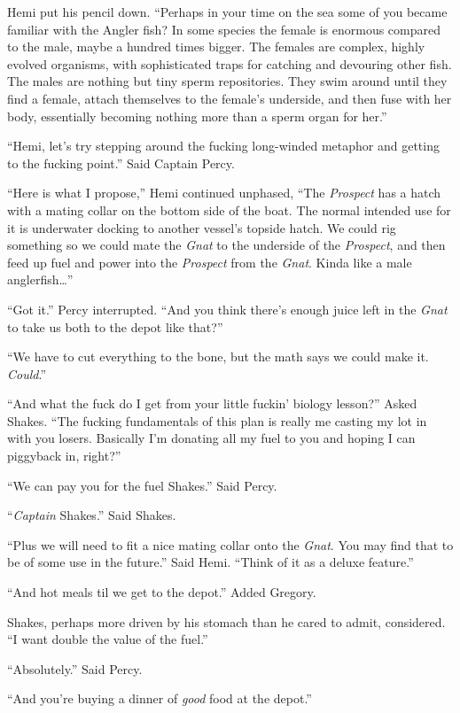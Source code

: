 \documentclass[]{scrbook}
\begin{document}
Hemi put his pencil down. ``Perhaps in your time on the sea some of you
became familiar with the Angler fish? In some species the female is
enormous compared to the male, maybe a hundred times bigger. The females
are complex, highly evolved organisms, with sophisticated traps for
catching and devouring other fish. The males are nothing but tiny sperm
repositories. They swim around until they find a female, attach
themselves to the female's underside, and then fuse with her body,
essentially becoming nothing more than a sperm organ for her.''

``Hemi, let's try stepping around the fucking long-winded metaphor and
getting to the fucking point.'' Said Captain Percy.

``Here is what I propose,'' Hemi continued unphased, ``The
\emph{Prospect} has a hatch with a mating collar on the bottom side of
the boat. The normal intended use for it is underwater docking to
another vessel's topside hatch. We could rig something so we could mate
the \emph{Gnat} to the underside of the \emph{Prospect}, and then feed
up fuel and power into the \emph{Prospect} from the \emph{Gnat}. Kinda
like a male anglerfish\ldots{}''

``Got it.'' Percy interrupted. ``And you think there's enough juice left
in the \emph{Gnat} to take us both to the depot like that?''

``We have to cut everything to the bone, but the math says we could make
it. \emph{Could}.''

``And what the fuck do I get from your little fuckin' biology lesson?''
Asked Shakes. ``The fucking fundamentals of this plan is really me
casting my lot in with you losers. Basically I'm donating all my fuel to
you and hoping I can piggyback in, right?''

``We can pay you for the fuel Shakes.'' Said Percy.

``\emph{Captain} Shakes.'' Said Shakes.

``Plus we will need to fit a nice mating collar onto the \emph{Gnat}.
You may find that to be of some use in the future.'' Said Hemi. ``Think
of it as a deluxe feature.''

``And hot meals til we get to the depot.'' Added Gregory.

Shakes, perhaps more driven by his stomach than he cared to admit,
considered. ``I want double the value of the fuel.''

``Absolutely.'' Said Percy.

``And you're buying a dinner of \emph{good} food at the depot.''
\end{document}
